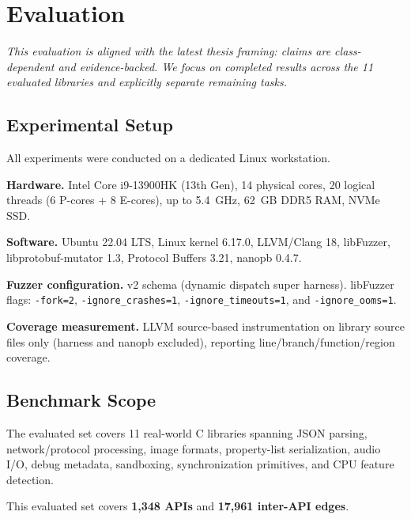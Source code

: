 \section{Evaluation}
\label{sec:eval}

\noindent\emph{This evaluation is aligned with the latest thesis framing: claims are class-dependent and evidence-backed. We focus on completed results across the 11 evaluated libraries and explicitly separate remaining tasks.}

\subsection{Experimental Setup}
\label{sec:eval_setup}

All experiments were conducted on a dedicated Linux workstation.

\textbf{Hardware.} Intel Core i9-13900HK (13th Gen), 14 physical cores, 20 logical threads (6 P-cores + 8 E-cores), up to 5.4~GHz, 62~GB DDR5 RAM, NVMe SSD.

\textbf{Software.} Ubuntu 22.04 LTS, Linux kernel 6.17.0, LLVM/Clang 18, libFuzzer, libprotobuf-mutator 1.3, Protocol Buffers 3.21, nanopb 0.4.7.

\textbf{Fuzzer configuration.} v2 schema (dynamic dispatch super harness).
libFuzzer flags: \texttt{-fork=2}, \texttt{-ignore\_crashes=1},
\texttt{-ignore\_timeouts=1}, and \texttt{-ignore\_ooms=1}.

\textbf{Coverage measurement.} LLVM source-based instrumentation on library source files only (harness and nanopb excluded), reporting line/branch/function/region coverage.

\subsection{Benchmark Scope}
\label{sec:eval_scope}

The evaluated set covers 11 real-world C libraries spanning JSON parsing, network/protocol processing, image formats, property-list serialization, audio I/O, debug metadata, sandboxing, synchronization primitives, and CPU feature detection.

This evaluated set covers \textbf{1,348 APIs} and \textbf{17,961 inter-API edges}.

